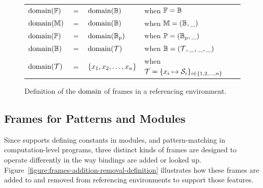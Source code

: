 \begin{figure}[H]
\centering
{\footnotesize
\begin{tabular}{lcll}
$\operatorname{domain}(\mathbb{F})$ & $=$ & $\operatorname{domain}(\mathbb{B})$ & when $\mathbb{F} = \mathbb{B}$\\
$\operatorname{domain}(\mathbb{M})$ & $=$ & $\operatorname{domain}(\mathbb{B})$ & when $\mathbb{M} = (\mathbb{B}, \_)$\\
$\operatorname{domain}(\mathbb{P})$ & $=$ & $\operatorname{domain}(\mathbb{B}_{\text{p}})$ & when $\mathbb{P} = (\mathbb{B}_{\text{p}}, \_)$\\
$\operatorname{domain}(\mathbb{B})$ & $=$ & $\operatorname{domain}(\mathcal{T})$ & when $\mathbb{B}=(\mathcal{T}, \_, \_, \_)$\\
$\operatorname{domain}(\mathcal{T})$ & $=$ & $\{x_1, x_2, \dots, x_n\}$ & when $\mathcal{T} = \{x_i \mapsto \mathcal{S}_i\}_{i \in \{1, 2, \dots, n\}}$
\end{tabular}
}
\caption[Definition of the domain of frames]{%
Definition of the $\operatorname{domain}$ of frames in a \Beluga referencing environment.
}
\label{figure:definition-domain-frames}
\end{figure}

\subsection{Frames for Patterns and Modules}


Since \Beluga supports defining constants in modules, and pattern-matching in computation-level programs, three distinct kinds of frames are designed to operate differently in the way bindings are added or looked up.
Figure~\ref{figure:frames-addition-removal-definition} illustrates how these frames are added to and removed from referencing environments to support those features.

